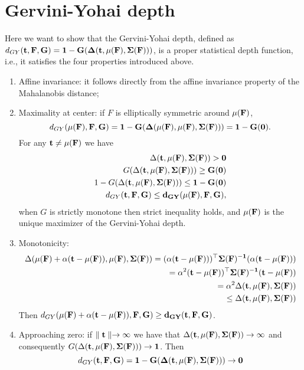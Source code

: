 \documentclass[a4paper,12pt]{article}
\begin{document}
\section{Gervini-Yohai depth}
Here we want to show that the Gervini-Yohai depth, defined as $d_{GY}(\bf{t}, F, G) = 1 - G(\Delta(\bf{t},\bf{\mu}(F),\bf{\Sigma}(F)))$, is a proper statistical depth function, i.e., it satisfies the four properties introduced above.
\begin{enumerate}
\item Affine invariance: it follows directly from the affine invariance property of the Mahalanobis distance;
\item  Maximality at center: if $F$ is elliptically symmetric around $\bf{\mu}(F)$, 
\begin{equation*}
d_{GY}(\bf{\mu}(F), F, G) = 1 - G(\Delta(\bf{\mu}(F),\bf{\mu}(F),\bf{\Sigma}(F))) = 1 - G(0) . 
\end{equation*}
For any $\bf{t} \not= \bf{\mu}(F)$ we have
\begin{align*}
\Delta(\bf{t},\bf{\mu}(F),\bf{\Sigma}(F))  > 0 \\
G(\Delta(\bf{t},\bf{\mu}(F),\bf{\Sigma}(F)))  \ge G(0) \\
1-G(\Delta(\bf{t},\bf{\mu}(F),\bf{\Sigma}(F)))  \le 1- G(0) \\
d_{GY}(\bf{t}, F, G)   \le d_{GY}(\bf{\mu}(F), F, G) , 
\end{align*}
when $G$ is strictly monotone then strict inequality holds, and $\bf{\mu}(F)$ is the unique maximizer of the Gervini-Yohai depth. 
\item  Monotonicity: 
\begin{align*}
\Delta(\bf{\mu}(F) + \alpha(\bf{t}-\bf{\mu}(F)),\bf{\mu}(F),\bf{\Sigma}(F))  = (\alpha(\bf{t} - \bf{\mu}(F)))^\top \bf{\Sigma}(F)^{-1}(\alpha(\bf{t} - \bf{\mu}(F))) \\
														 = \alpha^2 (\bf{t} - \bf{\mu}(F))^\top \bf{\Sigma}(F)^{-1}(\bf{t} - \bf{\mu}(F)) \\ 
														 = \alpha^2 \Delta(\bf{t},\bf{\mu}(F),\bf{\Sigma}(F)) \\
														 \le \Delta(\bf{t},\bf{\mu}(F),\bf{\Sigma}(F))
\end{align*}
Then  $d_{GY}(\bf{\mu}(F) + \alpha(\bf{t}-\bf{\mu}(F)), F, G) \ge d_{GY}(\bf{t}, F, G)$.
\item Approaching zero: if $\parallel \bf{t} \parallel \rightarrow \infty $ we have that $\Delta(\bf{t},\bf{\mu}(F),\bf{\Sigma}(F)) \rightarrow \infty$ and consequently  $G(\Delta(\bf{t},\bf{\mu}(F),\bf{\Sigma}(F))) \rightarrow 1$.
Then 
\begin{equation*}
d_{GY}(\bf{t}, F, G) = 1 - G(\Delta(\bf{t},\bf{\mu}(F),\bf{\Sigma}(F))) \rightarrow 0
\end{equation*}
\end{enumerate}
\end{document}
